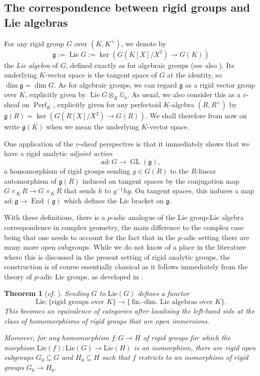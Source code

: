 \documentclass[10pt,a4paper]{article}
\newtheorem{Theorem}[thm]{Theorem}
\theoremstyle{definition}
\theoremstyle{remark}
\newcommand{\lra}{\longrightarrow}
\newcommand{\G}{\mathbb{G}}
\newcommand{\mg}{\mathfrak{g}}
\newcommand{\End}{\operatorname{End}}
\newcommand{\GL}{\operatorname{GL}}
\newcommand{\Perf}{\operatorname{Perf}}
\newcommand{\ad}{\mathrm{ad}}
\numberwithin{equation}{section}
\begin{document}
\subsection{The correspondence between rigid groups and Lie algebras}

For any rigid group $G$ over $(K,K^+)$, we denote by 
\[\mathfrak g:=\operatorname{Lie} G:=\ker\left(G(K[X]/X^2)\to G(K)\right)\]
the \emph{Lie algebra} of $G$, defined exactly as for algebraic groups (see also \cite[Section~1.2]{Fargues-groupes-analytiques}). Its underlying $K$-vector space is the tangent space of $G$ at the identity, so $\dim \mathfrak g=\dim G$. As for algebraic groups, we can  regard $\mathfrak g$ as a rigid vector group over $K$, explicitly given by $\operatorname{Lie} G\otimes_K \G_a$. As usual, we also consider this as a $v$-sheaf on $\Perf_K$, explicitly given for any perfectoid $K$-algebra $(R,R^+)$ by $\mathfrak g(R)=\ker(G(R[X]/X^2)\to G(R))$.
We shall therefore from now on write $\mathfrak g(K)$ when we mean the underlying $K$-vector space. 

One application of the $v$-sheaf perspective is that it immediately shows that we have a rigid analytic \emph{adjoint action}
\[ \ad\colon G\lra \GL(\mathfrak g),\]
a homomorphism of rigid groups sending $g\in G(R)$ to the $R$-linear automorphism of $\mathfrak g(R)$ induced on tangent spaces by the conjugation map $G\times_KR\to G\times_KR$ that sends $h$ to $g^{-1}hg$. On tangent spaces, this induces a map $\ad\colon \mg\to \End(\mathfrak g)$ which defines the Lie bracket on $\mg$.

\medskip

With these definitions, there is a $p$-adic analogue of the Lie group-Lie algebra correspondence in complex geometry,  the main difference to the complex case being that one needs to account for the fact that in the $p$-adic setting there are many more open subgroups.  While we do not know of a place in the literature where this is discussed in the present setting of rigid analytic groups, the construction is of course essentially classical as it follows immediately from the theory of $p$-adic Lie groups, as developed in \cite{Bourbaki-Lie,Serre_Lie,Schneider_Lie}. 

\begin{Theorem}[\textit{cf.} {\cite[Part~II]{Serre_Lie}}]\label{t:Lie-grp-Lie-alg-correspondence}
	Sending $G$ to $\mathrm{Lie}(G)$ defines a functor
	\[ \mathrm{Lie}\colon \{  \text{rigid groups over $K$}\}\lra \{\,\text{fin.-dim.\ Lie algebras over $K$}\}.\]
	This
	 becomes an equivalence of categories after localising the left-hand side at the class of homomorphisms of rigid groups that are open immersions.
	
	Moreover, for any homomorphism  $f\colon G\to H$ of rigid groups for which the morphism $\mathrm{Lie}(f)\colon \mathrm{Lie}(G)\to \mathrm{Lie}(H)$ is an isomorphism, there are rigid open subgroups $G_0\subseteq G$ and $H_0\subseteq H$ such that $f$ restricts to an isomorphism of rigid groups $G_0\to H_0$.
\end{Theorem}
\end{document}
